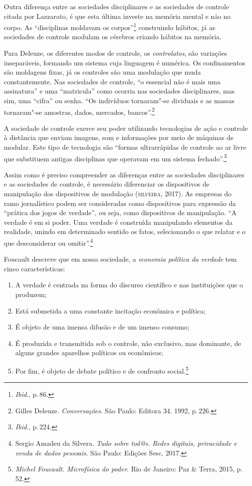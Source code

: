 Outra diferença entre as sociedades disciplinares e as sociedades de
controle citada por Lazzarato, é que esta última investe na
memória mental e não no corpo. As ``disciplinas moldavam os corpos''\footnote{\textit{Ibid}., p.\,86.} construindo hábitos, já as sociedades de controle modulam os
cérebros criando hábitos na memória.

Para Deleuze, os diferentes modos de controle, os
\textit{controlatos}, são variações inseparáveis, formando um sistema cuja
linguagem é numérica. Os confinamentos são moldagens fixas, já os
controles são uma modulação que muda constantemente. Nas sociedades de
controle, ``o essencial não é mais uma assinatura'' e uma ``matricula''
como ocorria nas sociedades disciplinares, mas sim, uma ``cifra'' ou
senha. ``Os indivíduos tornaram"-se dividuais e as massas tornaram"-se
amostras, dados, mercados, bancos''.\footnote{Gilles Deleuze. \textit{Conversações}. São Paulo: Editora 34. 1992, p.\,226.}

A sociedade de controle exerce seu poder utilizando tecnologias de ação
e controle à distância que enviam imagens, som e informações por meio de
máquinas de modular. Este tipo de tecnologia são ``formas ultrarrápidas
de controle ao ar livre que substituem antigas disciplinas que operavam
em um sistema fechado''.\footnote{\textit{Ibid}., p.\,224.}

Assim como é preciso compreender as diferenças entre as sociedades
disciplinares e as sociedades de controle, é necessário diferenciar os
dispositivos de manipulação dos dispositivos de modulação (\textsc{silveira},
2017). As empresas do ramo jornalístico podem ser consideradas como
dispositivos para expressão da ``prática dos jogos de verdade'', ou
seja, como dispositivos de manipulação. ``A verdade é em si poder. Uma
verdade é construída manipulando elementos da realidade, unindo em
determinado sentido os fatos, selecionando o que relatar e o que
desconsiderar ou omitir''.\footnote{Sergio Amadeu da Silvera. \textit{Tudo sobre tod@s. Redes digitais, privacidade e venda de dados pessoais}. São Paulo: Edições Sesc, 2017.}

Foucault descreve que em nossa sociedade, a \textit{economia política da verdade} tem cinco características: 

\begin{enumerate}
\item A verdade é centrada na forma
do discurso científico e nas instituições que o produzem; 

\item Está submetida a uma constante incitação econômica e política;

\item É objeto de uma imensa difusão e de um imenso consumo; 

\item É produzida e transmitida sob o controle, não exclusivo, mas dominante, de alguns grandes aparelhos políticos ou econômicos; 

\item Por fim, é objeto de debate político e de confronto social.\footnote{\textit{Michel Foucault. Microfísica do poder}. Rio de Janeiro: Paz \& Terra, 2015, p.\,52.}
\end{enumerate}

